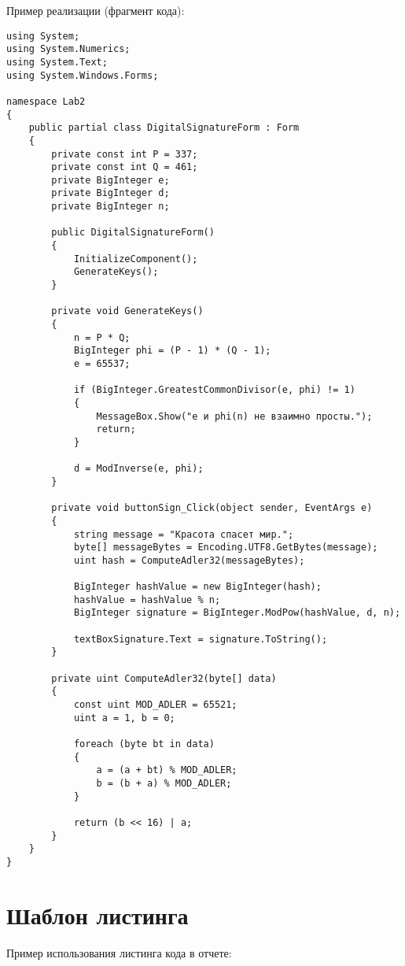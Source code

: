 \documentclass[a4paper, 14pt]{extarticle}
\begin{document}
Пример реализации (фрагмент кода):
\begin{lstlisting}[caption=Реализация ЭЦП]
using System;
using System.Numerics;
using System.Text;
using System.Windows.Forms;

namespace Lab2
{
    public partial class DigitalSignatureForm : Form
    {
        private const int P = 337;
        private const int Q = 461;
        private BigInteger e;
        private BigInteger d;
        private BigInteger n;

        public DigitalSignatureForm()
        {
            InitializeComponent();
            GenerateKeys();
        }

        private void GenerateKeys()
        {
            n = P * Q;                      
            BigInteger phi = (P - 1) * (Q - 1);  
            e = 65537;
            
            if (BigInteger.GreatestCommonDivisor(e, phi) != 1)
            {
                MessageBox.Show("e и phi(n) не взаимно просты.");
                return;
            }

            d = ModInverse(e, phi);
        }

        private void buttonSign_Click(object sender, EventArgs e)
        {
            string message = "Красота спасет мир.";
            byte[] messageBytes = Encoding.UTF8.GetBytes(message);
            uint hash = ComputeAdler32(messageBytes);

            BigInteger hashValue = new BigInteger(hash);
            hashValue = hashValue % n;
            BigInteger signature = BigInteger.ModPow(hashValue, d, n);

            textBoxSignature.Text = signature.ToString();
        }

        private uint ComputeAdler32(byte[] data)
        {
            const uint MOD_ADLER = 65521;
            uint a = 1, b = 0;

            foreach (byte bt in data)
            {
                a = (a + bt) % MOD_ADLER;
                b = (b + a) % MOD_ADLER;
            }

            return (b << 16) | a;
        }
    }
}
\end{lstlisting}

\section{Шаблон листинга}
Пример использования листинга кода в отчете:
\end{document}
